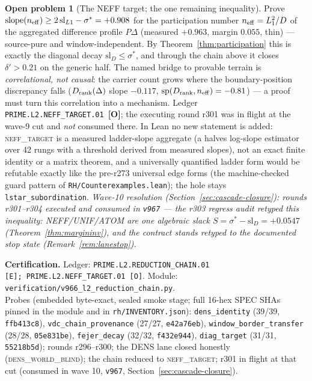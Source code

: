 \documentclass[11pt]{article}
\newcommand{\mO}{\textcolor{openred}{\textbf{[O]}}}
\newcommand{\certbox}[3]{%
  \par\medskip\noindent\colorbox{certgray}{\parbox{\dimexpr\linewidth-2\fboxsep}{%
    \footnotesize\raggedright\textbf{Certification.} Ledger: \texttt{#1}.\quad
    Module: \texttt{#2}.\\ #3}}\par\medskip}
\theoremstyle{definition}
\newtheorem{openproblem}[theorem]{Open problem}
\theoremstyle{remark}
\begin{document}
\begin{openproblem}[The NEFF target; the one remaining inequality]
\label{op:neff}
Prove $\mathrm{slope}(n_{\rm eff}) \ge 2\,\mathrm{sl}_{L1} - \sigma^*
= +0.908$ for the participation number $n_{\rm eff} = L_1^2/D$ of the
aggregated difference profile $P\Delta$ (measured $+0.963$, margin
$0.055$, thin) --- source-pure and window-independent.  By
Theorem~\ref{thm:participation} this is exactly the diagonal decay
$\mathrm{sl}_D \le \sigma^*$, and through the chain above it closes
$\delta' > 0.21$ on the generic half.  The named bridge to provable
terrain is \emph{correlational, not causal}: the carrier count grows
where the boundary-position discrepancy falls ($D_{\rm rank}(\Delta)$
slope $-0.117$, $\mathrm{sp}(D_{\rm rank}, n_{\rm eff}) = -0.81$) ---
a proof must turn this correlation into a mechanism.  Ledger
\texttt{PRIME.L2.NEFF\_TARGET.01}~\mO; the executing round r301 was
in flight at the wave-9 cut and \emph{not} consumed there.  In Lean
no new statement is added: \textsc{neff\_target} is a measured
ladder-slope aggregate (a halves log-slope estimator over 42 rungs
with a threshold derived from measured slopes), not an exact finite
identity or a matrix theorem, and a universally quantified ladder
form would be refutable exactly like the pre-r273 universal edge
forms (the machine-checked guard pattern of
\texttt{RH/Counterexamples.lean}); the hole stays
\texttt{lstar\_subordination}.  \emph{Wave-10 resolution
(Section~\ref{sec:cascade-closure}): rounds r301--r304 executed and
consumed in \texttt{v967} --- the r303 regress audit retyped this
inequality: NEFF/UNIF/ATOM are one algebraic slack $S = \sigma^* -
\mathrm{sl}_D = +0.0547$ (Theorem~\ref{thm:margininv}), and the
contract stands retyped to the documented stop state
(Remark~\ref{rem:lanestop}).}
\end{openproblem}

\certbox{PRIME.L2.REDUCTION\_CHAIN.01 [E];\
PRIME.L2.NEFF\_TARGET.01 [O]}%
{verification/v966\_l2\_reduction\_chain.py}%
{Probes (embedded byte-exact, sealed smoke stage; full 16-hex SPEC SHAs
pinned in the module and in \texttt{rh/INVENTORY.json}):
\texttt{dens\_identity} (39/39, \texttt{ffb413c8}),
\texttt{vdc\_chain\_provenance} (27/27, \texttt{e42a76eb}),
\texttt{window\_border\_transfer} (28/28, \texttt{05e831be}),
\texttt{fejer\_decay} (32/32, \texttt{f432e944}),
\texttt{diag\_target} (31/31, \texttt{55218b5d});
rounds r296--r300; the DENS lane closed honestly
(\textsc{dens\_world\_blind}); the chain reduced to
\textsc{neff\_target}; r301 in flight at that cut (consumed in wave
10, \texttt{v967}, Section~\ref{sec:cascade-closure}).}
\end{document}

